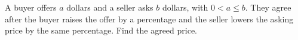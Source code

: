 A buyer offers $a$ dollars and a seller asks $b$ dollars, with $0<a\le b$. They agree after the buyer raises the offer by a percentage and the seller lowers the asking price by the same percentage. Find the agreed price.
